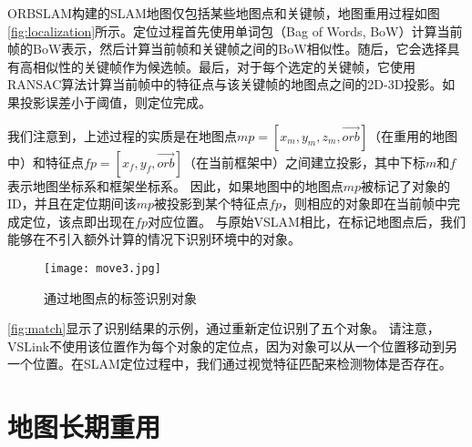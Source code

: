 ORBSLAM\cite{mur2017orb}构建的SLAM地图仅包括某些地图点和关键帧，地图重用过程如图\ref{fig:localization}所示。定位过程首先使用单词包（Bag of Words, BoW）\cite{galvez2012bags}计算当前帧的BoW表示，然后计算当前帧和关键帧之间的BoW相似性。随后，它会选择具有高相似性的关键帧作为候选帧。最后，对于每个选定的关键帧，它使用RANSAC\cite{derpanis2010overview}算法计算当前帧中的特征点与该关键帧的地图点之间的2D-3D投影。如果投影误差小于阈值，则定位完成。

我们注意到，上述过程的实质是在地图点$mp = [x_m,y_m,z_m,\vec{orb}]$（在重用的地图中）和特征点$fp = [x_f,y_f,\vec{orb}]$（在当前框架中）之间建立投影，其中下标$m$和$f$表示地图坐标系和框架坐标系。
因此，如果地图中的地图点$mp$被标记了对象的ID，并且在定位期间该$mp$被投影到某个特征点$fp$，则相应的对象即在当前帧中完成定位，该点即出现在$fp$对应位置。
与原始VSLAM相比，在标记地图点后，我们能够在不引入额外计算的情况下识别环境中的对象。


\begin{figure}[htbp]
	\centering
	\texttt{[image: move3.jpg]}
	\caption{通过地图点的标签识别对象}
	\label{fig:match}
\end{figure}

\autoref{fig:match}显示了识别结果的示例，通过重新定位识别了五个对象。
请注意，VSLink不使用该位置作为每个对象的定位点，因为对象可以从一个位置移动到另一个位置。在SLAM定位过程中，我们通过视觉特征匹配来检测物体是否存在。


\section{地图长期重用}

